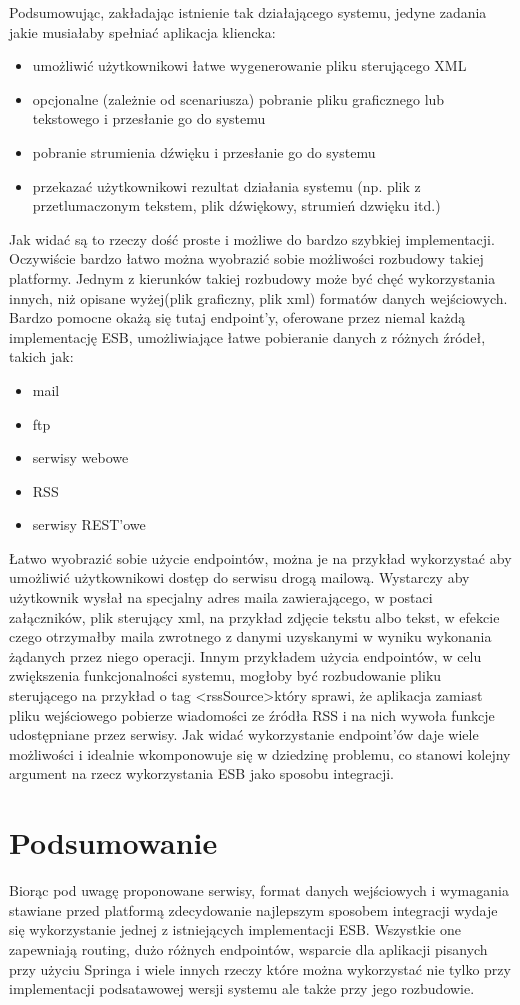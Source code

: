 Podsumowując, zakładając istnienie tak działającego systemu, jedyne zadania jakie musiałaby spełniać aplikacja kliencka:
\begin{itemize}
	\item umożliwić użytkownikowi łatwe wygenerowanie pliku sterującego XML
	\item opcjonalne (zależnie od scenariusza) pobranie pliku graficznego lub tekstowego i przesłanie go do systemu
	\item pobranie strumienia dźwięku i przesłanie go do systemu
	\item przekazać użytkownikowi rezultat działania systemu (np. plik z przetlumaczonym tekstem, plik dźwiękowy, strumień dzwięku itd.)
\end{itemize}
Jak widać są to rzeczy dość proste i możliwe do bardzo szybkiej implementacji. Oczywiście bardzo łatwo można wyobrazić sobie możliwości rozbudowy takiej platformy. Jednym z kierunków takiej rozbudowy może być chęć wykorzystania innych, niż opisane wyżej(plik graficzny, plik xml) formatów danych wejściowych.  Bardzo pomocne okażą się tutaj endpoint'y, oferowane przez niemal każdą implementację ESB, umożliwiające łatwe pobieranie danych z różnych źródeł, takich jak:
\begin{itemize}
	\item mail
	\item ftp
	\item serwisy webowe
	\item RSS
	\item serwisy REST'owe
\end{itemize}
Łatwo wyobrazić sobie użycie endpointów, można je na przykład wykorzystać aby umożliwić użytkownikowi dostęp do serwisu drogą mailową. Wystarczy aby użytkownik wysłał na specjalny adres maila zawierającego, w postaci załączników, plik sterujący xml, na przykład zdjęcie tekstu albo tekst, w efekcie czego otrzymałby maila zwrotnego z danymi uzyskanymi w wyniku wykonania żądanych przez niego operacji. Innym przykładem użycia endpointów, w celu zwiększenia funkcjonalności systemu, mogłoby być rozbudowanie pliku sterującego na przykład o tag \textless rssSource\textgreater który sprawi, że aplikacja zamiast pliku wejściowego pobierze wiadomości ze źródła RSS i na nich wywoła funkcje udostępniane przez serwisy. Jak widać wykorzystanie endpoint'ów daje wiele możliwości i idealnie wkomponowuje się w dziedzinę problemu, co stanowi kolejny argument na rzecz wykorzystania ESB jako sposobu integracji.

\section*{Podsumowanie}
Biorąc pod uwagę proponowane serwisy, format danych wejściowych i wymagania stawiane przed platformą zdecydowanie najlepszym sposobem integracji wydaje się wykorzystanie jednej z istniejących implementacji ESB. Wszystkie one zapewniają routing, dużo różnych endpointów, wsparcie dla aplikacji pisanych przy użyciu Springa i wiele innych rzeczy które można wykorzystać nie tylko przy implementacji podsatawowej wersji systemu ale także przy jego rozbudowie. 



